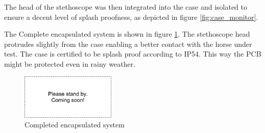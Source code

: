 The head of the stethoscope was then integrated into the case and isolated to ensure a decent level of splash proofness, as depicted in figure \ref{fig:case_monitor}.

The Complete encapsulated system is shown in figure \ref{fig:complete_monitor}. The stethoscope head protrudes slightly from the case enabling a better contact with the horse under test. The case is certified to be splash proof according to IP54. This way the PCB might be protected even in rainy weather. 

\begin{figure}
\centering
\includegraphics[width=0.4\textwidth]{Images/dummy}
\caption{Completed encapsulated system}
\label{fig:complete_monitor}
\end{figure}
